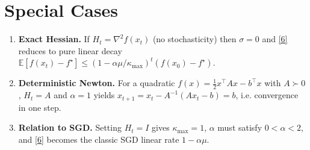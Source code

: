 \documentclass{article}
\newcommand{\E}{\mathbb{E}}
\begin{document}
\section*{Special Cases}
\begin{enumerate}[leftmargin=*]
\item \textbf{Exact Hessian.} If $H_t=\nabla^2 f(x_t)$ (no stochasticity) then $\sigma=0$ and \eqref{6} reduces to pure linear decay $\E[f(x_t)-f^\star]\le (1-\alpha\mu/\kappa_{\max})^{t}(f(x_0)-f^\star)$.
\item \textbf{Deterministic Newton.} For a quadratic $f(x)=\tfrac12 x^\top A x-b^\top x$ with $A\succ0$, $H_t=A$ and $\alpha=1$ yields $x_{t+1}=x_t-A^{-1}(Ax_t-b)=b$, i.e. convergence in one step.
\item \textbf{Relation to SGD.} Setting $H_t=I$ gives $\kappa_{\max}=1$, $\alpha$ must satisfy $0<\alpha<2$, and \eqref{6} becomes the classic SGD linear rate $1-\alpha\mu$.
\end{enumerate}
\end{document}

